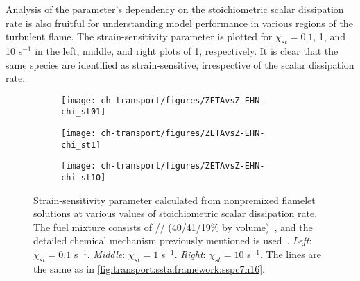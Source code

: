 Analysis of the parameter's dependency on the stoichiometric scalar dissipation rate is also fruitful for understanding model performance in various regions of the turbulent flame. The strain-sensitivity parameter is plotted for $\chi_{st} = 0.1$, 1, and 10 s$^{-1}$ in the left, middle, and right plots of \cref{fig:transport:ssta:dependencies:chist}, respectively. It is clear that the same species are identified as strain-sensitive, irrespective of the scalar dissipation rate.


\begin{figure}[ht]
  \centering
  \begin{subfigure}[b]{0.33\linewidth}
    \texttt{[image: ch-transport/figures/ZETAvsZ-EHN-chi\_st01]}
  \end{subfigure}%
  \begin{subfigure}[b]{0.33\linewidth}
    \texttt{[image: ch-transport/figures/ZETAvsZ-EHN-chi\_st1]}
  \end{subfigure}%
  \begin{subfigure}[b]{0.33\linewidth}
    \texttt{[image: ch-transport/figures/ZETAvsZ-EHN-chi\_st10]}
  \end{subfigure}
  \caption[Dependency of Strain-Sensitivity Parameter $\zeta_k$ on $\chi_{st}$]{Strain-sensitivity parameter calculated from nonpremixed flamelet solutions at various values of stoichiometric scalar dissipation rate. The fuel mixture consists of // (40/41/19\% by volume)~\cite{mahmoud2017}, and the detailed chemical mechanism previously mentioned is used~\cite{blanquart2009588,narayanaswamy2010}. \textit{Left}: $\chi_{st} = 0.1$ s$^{-1}$. \textit{Middle}: $\chi_{st} = 1$ s$^{-1}$. \textit{Right}: $\chi_{st} = 10$ s$^{-1}$. The lines are the same as in \cref{fig:transport:ssta:framework:sspc7h16}.}
  \label{fig:transport:ssta:dependencies:chist}
\end{figure}

